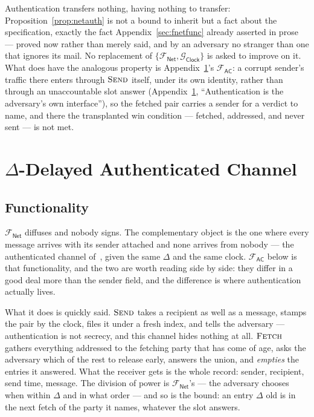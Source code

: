 \documentclass[11pt,a4paper]{article}
\newcommand{\op}[1]{\textsc{#1}}
\newcommand{\Gclock}{\mathcal{G}_{\mathsf{Clock}}}
\newcommand{\Fnet}{\mathcal{F}_{\mathsf{Net}}}
\newcommand{\Fac}{\mathcal{F}_{\mathsf{AC}}}
\theoremstyle{accentdef}
\theoremstyle{accentplain}
\begin{document}
Authentication transfers nothing, having nothing to transfer: Proposition~\ref{prop:netauth} is
not a bound to inherit but a fact about the specification, exactly the fact
Appendix~\ref{sec:fnetfunc} already asserted in prose --- proved now rather than merely said, and
by an adversary no stranger than one that ignores its mail. No replacement of $\{\Fnet,\Gclock\}$
is asked to improve on it. What does have the analogous property is Appendix~\ref{sec:fac}'s
$\Fac$: a corrupt sender's traffic there enters through $\op{Send}$ itself, under its own identity,
rather than through an unaccountable slot answer (Appendix~\ref{sec:fac}, ``Authentication is the
adversary's own interface''), so the fetched pair carries a sender for a verdict to name, and there
the transplanted win condition --- fetched, addressed, and never sent --- is not met.

\section{$\Delta$-Delayed Authenticated Channel}\label{sec:fac}

\subsection{Functionality}\label{sec:facfunc}

$\Fnet$ diffuses and nobody signs. The complementary object is the one where every message
arrives with its sender attached and none arrives from nobody --- the authenticated channel
of~\cite{Canetti20}, given the same $\Delta$ and the same clock. $\Fac$ below is that
functionality, and the two are worth reading side by side: they differ in a good deal more than
the sender field, and the difference is where authentication actually lives.

What it does is quickly said. $\op{Send}$ takes a recipient as well as a message, stamps the pair
by the clock, files it under a fresh index, and tells the adversary --- authentication is not
secrecy, and this channel hides nothing at all. $\op{Fetch}$ gathers everything addressed to the
fetching party that has come of age, asks the adversary which of the rest to release early,
answers the union, and \emph{empties} the entries it answered. What the receiver gets is the whole
record: sender, recipient, send time, message. The division of power is $\Fnet$'s --- the
adversary chooses when within $\Delta$ and in what order --- and so is the bound: an entry
$\Delta$ old is in the next fetch of the party it names, whatever the slot answers.
\end{document}
